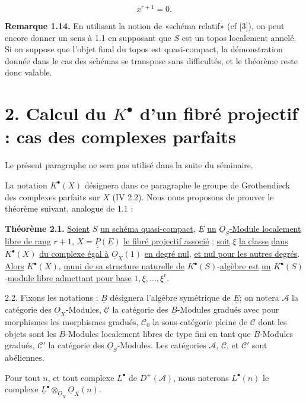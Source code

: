 
\begin{equation}\tag{1.13.2}
  x^{r+1}=0.
\end{equation}

\textbf{Remarque 1.14.} En utilisant la notion de «schéma relatif» (cf [3]), on peut encore donner un sens à 1.1 en supposant que \(S\) est un topos localement annelé. Si on suppose que l'objet final du topos est quasi-compact, la démonstration donnée dans le cas des schémas se transpose sans difficultés, et le théorème reste donc valable.

\section*{2. Calcul du \(K^{\bullet}\) d'un fibré projectif : cas des complexes parfaits}


Le présent paragraphe ne sera pas utilisé dans la suite du séminaire.

La notation \(K^{\bullet}(X)\) désignera dans ce paragraphe le groupe de Grothendieck des complexes parfaits sur \(X\) (IV 2.2). Nous nous proposons de prouver le théorème suivant, analogue de 1.1 :

\textbf{Théorème 2.1.} \uline{Soient} \(S\) \uline{un schéma quasi-compact}, \(\underline{E}\) \uline{un} \(\underline{O}_S\)\uline{-Module localement libre de rang} \(r+1\), \(X=\underline{\underline{P}}(\underline{E})\) \uline{le fibré projectif associé} ; \uline{soit} \(\xi\) \uline{la classe} \uline{dans} \(K^{\bullet}(X)\) \uline{du complexe égal à} \(\underline{O}_X(1)\) \uline{en degré nul}, \uline{et nul pour les autres degrés}. \uline{Alors} \(K^{\bullet}(X)\), \uline{muni de sa structure naturelle de} \(K^{\bullet}(S)\)-\uline{algèbre est} \uline{un} \(K^{\bullet}(S)\)-\uline{module libre admettant pour base} \(1,\xi,\ldots,\xi^r\).

2.2. Fixons les notations : \(\underline{B}\) désignera l'algèbre symétrique de \(\underline{E}\); on notera \(\mathcal A\) la catégorie des \(\underline{O}_X\)-Modules, \(\mathcal C\) la catégorie des \(\underline{B}\)-Modules gradués avec pour morphismes les morphismes gradués, \(\mathcal C_0\) la sous-catégorie pleine de \(\mathcal C\) dont les objets sont les \(\underline{B}\)-Modules localement libres de type fini en tant que \(\underline{B}\)-Modules gradués, \(\mathcal C'\) la catégorie des \(\underline{O}_S\)-Modules. Les catégories \(\mathcal A\), \(\mathcal C\), et \(\mathcal C'\) sont abéliennes.

Pour tout \(n\), et tout complexe \(\underline{L}^\bullet\) de \(D^+(\mathcal A)\), nous noterons \(\underline{L}^\bullet(n)\) le complexe \(\underline{L}^\bullet\otimes_{\underline{O}_X}\underline{O}_X(n)\).

